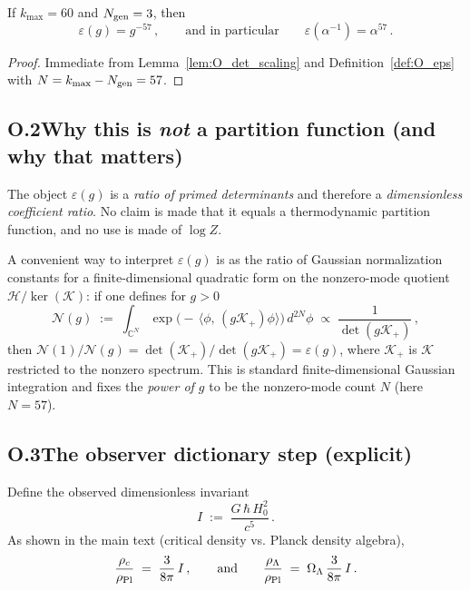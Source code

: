 \begin{corollary}
\label{cor:O_alpha57}
If $k_{\max}=60$ and $N_{\rm gen}=3$, then
\begin{equation}
\varepsilon(g)=g^{-57}\,,
\qquad\text{and in particular}\qquad
\varepsilon(\alpha^{-1})=\alpha^{57}\,.
\end{equation}
\end{corollary}

\begin{proof}
Immediate from Lemma~\ref{lem:O_det_scaling} and Definition~\ref{def:O_eps} with $N=k_{\max}-N_{\rm gen}=57$.
\end{proof}

\subsection{O.2\quad Why this is \emph{not} a partition function (and why that matters)}
The object $\varepsilon(g)$ is a \emph{ratio of primed determinants} and therefore a \emph{dimensionless
coefficient ratio}. No claim is made that it equals a thermodynamic partition function, and no use is
made of $\log Z$.

A convenient way to interpret $\varepsilon(g)$ is as the ratio of Gaussian normalization constants for a
finite-dimensional quadratic form on the nonzero-mode quotient $\mathcal{H}/\ker(\mathcal{K})$:
if one defines for $g>0$
\begin{equation}
\mathcal{N}(g)\;:=\;\int_{\mathbb{C}^{N}} \exp\!\Big(-\,\langle \phi,\,(g\mathcal{K}_+)\phi\rangle\Big)\,d^{2N}\phi
\;\propto\; \frac{1}{\det(g\mathcal{K}_+)}\,,
\end{equation}
then $\mathcal{N}(1)/\mathcal{N}(g)=\det(\mathcal{K}_+)/\det(g\mathcal{K}_+)=\varepsilon(g)$, where
$\mathcal{K}_+$ is $\mathcal{K}$ restricted to the nonzero spectrum.
This is standard finite-dimensional Gaussian integration and fixes the \emph{power of $g$} to be the
nonzero-mode count $N$ (here $N=57$).

\subsection{O.3\quad The observer dictionary step (explicit)}
Define the observed dimensionless invariant
\begin{equation}
I\;:=\;\frac{G\,\hbar\,H_0^2}{c^5}\,.
\end{equation}
As shown in the main text (critical density vs. Planck density algebra),
\begin{equation}
\frac{\rho_c}{\rho_{\rm Pl}}
\;=\;
\frac{3}{8\pi}\,I\,,
\qquad\text{and}\qquad
\frac{\rho_\Lambda}{\rho_{\rm Pl}}
\;=\;
\Omega_\Lambda\,\frac{3}{8\pi}\,I\,.
\label{eq:O_dictionary_rho}
\end{equation}

